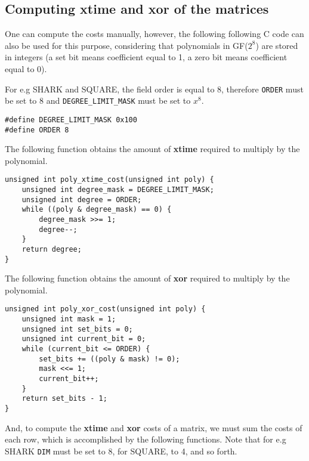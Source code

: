 \documentclass{report}
\begin{document}
\begin{footnotesize}

\section{Computing \textbf{xtime} and \textbf{xor} of the matrices}

One can compute the costs manually, however, the following following C code can also be used for this purpose, considering that polynomials in GF($2^8$) are stored in integers (a set bit means coefficient equal to 1, a zero bit means coefficient equal to 0).

For e.g SHARK and SQUARE, the field order is equal to 8, therefore \texttt{ORDER} must be set to 8 and \texttt{DEGREE_LIMIT_MASK} must be set to $x^8$.

\begin{verbatim}
#define DEGREE_LIMIT_MASK 0x100
#define ORDER 8
\end{verbatim}

The following function obtains the amount of \textbf{xtime} required to multiply by the polynomial.

\begin{verbatim}
unsigned int poly_xtime_cost(unsigned int poly) {
	unsigned int degree_mask = DEGREE_LIMIT_MASK;
	unsigned int degree = ORDER;
	while ((poly & degree_mask) == 0) {
		degree_mask >>= 1;
		degree--;
	}
	return degree;
}
\end{verbatim}

The following function obtains the amount of \textbf{xor} required to multiply by the polynomial.
\begin{verbatim}
unsigned int poly_xor_cost(unsigned int poly) {
	unsigned int mask = 1;
	unsigned int set_bits = 0;
	unsigned int current_bit = 0;
	while (current_bit <= ORDER) {
		set_bits += ((poly & mask) != 0);
		mask <<= 1;
		current_bit++;
	}
	return set_bits - 1;
}
\end{verbatim}

And, to compute the \textbf{xtime} and \textbf{xor} costs of a matrix, we must sum the costs of each row, which is accomplished by the following functions. Note that for e.g SHARK \texttt{DIM} must be set to 8, for SQUARE, to 4, and so forth.


\end{footnotesize}
\end{document}
